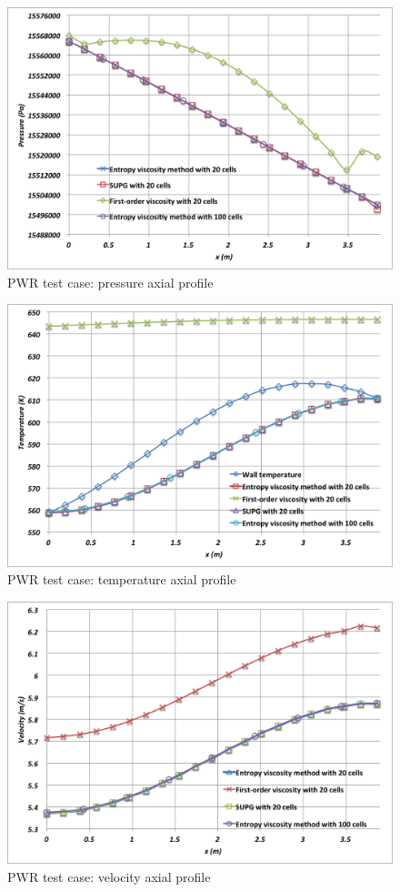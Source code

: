 \documentclass[12pt]{article}
\begin{document}
\begin{figure}[h]
\centering
\includegraphics[scale=0.4]{plots/Pressure.png}
\caption{PWR test case: pressure axial profile}
\label{fig:Pressure}
\end{figure}
\begin{figure}[h]
\centering
\includegraphics[scale=0.4]{plots/Temperature.png}
\caption{PWR test case: temperature axial profile}
\label{fig:Temperature}
\end{figure}
\begin{figure}[h]
\centering
\includegraphics[scale=0.4]{plots/Velocity.png}
\caption{PWR test case: velocity axial profile}
\label{fig:Velocity}
\end{figure}
\end{document}

